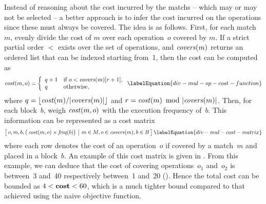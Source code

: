 Instead of reasoning about the cost incurred by the \glspl{match} -- which may
or may not be selected -- a better approach is to infer the cost incurred on the
\glspl{operation} since these must always be covered.
%
The idea is as follows.
%
First, for each \gls{match}~$m$, evenly divide the cost of $m$ over each
\gls{operation}~$o$ covered by $m$.
%
If a strict partial order $<$ exists over the set of \glspl{operation}, and
$\operatorname{\textrm{\textit{covers}}}(m)$ returns an ordered list that can be indexed starting from~\num{1},
then the cost can be computed as
%
\begin{equation}
  \mOpCost(m, o) =
  \left\{
  \begin{array}{ll}
    q + 1 & \text{if $o < \mCovers(m)[r+1]$}, \\
    q     & \text{otherwise}, \\
  \end{array}
  \right.
  \labelEquation{div-mul-op-cost-function}
\end{equation}
%
where \mbox{$q = \lfloor \mCost(m) / \mCard{\!\mCovers(m)} \rfloor$} and
\mbox{$r = \mCost(m) \! \mod \mCard{\!\mCovers(m)}$}.
%
Then, for each \gls{block}~$b$, weigh \mbox{$\operatorname{\textrm{\textit{cost}}}(m, o)$} with the execution
frequency of~$b$.
%
This information can be represented as a cost matrix
%
\begin{equation}
  \begin{bmatrix}
    \begin{array}{@{\:}c|c@{\:}}
        o, m, b, \big( \mOpCost(m, o) \times \mFreq(b) \big)
      & m \in \mMatchSet, o \in \mCovers(m), b \in \mBlockSet
    \end{array}
  \end{bmatrix}
  \labelEquation{div-mul-cost-matrix}
\end{equation}
%
where each row denotes the cost of an \gls{operation}~$o$ if covered by a
\gls{match}~$m$ and placed in a \gls{block}~$b$.
%
An example of this cost matrix is given in .
%
From this example, we can deduce that the cost of covering
\glspl{operation}~$o_1$ and~$o_2$ is between~\num{3} and~\num{40} respectively
between~\num{1} and~\num{20} ().
%
Hence the total cost can be bounded as \mbox{$4 < \mVar{cost} < 60$}, which is a
much tighter bound compared to that achieved using the naive \gls{objective
  function}.

